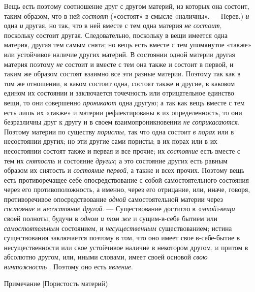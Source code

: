Вещь есть поэтому соотношение друг с другом материй, из которых она состоит,
таким образом, что в ней {\em состоят} («состоят» в
смысле «наличны». — Перев.) {\em и} одна
{\em и} другая, но так, что в ней вместе с тем одна
материя {\em не состоит}, поскольку состоит другая.
Следовательно, поскольку в вещи имеется одна материя, другая тем самым
снята; но вещь есть вместе с тем упомянутое «также» или устойчивое наличие
других материй. В состоянии одной материи другая материя поэтому
{\em не} состоит и вместе с тем она также и состоит в
первой, и таким же образом состоят взаимно все эти разные материи. Поэтому
так как в том же отношении, в каком состоит одна, состоят также и другие, в
каковом едином их состоянии и заключается точечность или отрицательное
единство вещи, то они совершенно {\em проникают} одна
другую; а так как вещь вместе с тем есть лишь их «также» и материи
рефлектированы в их определенность, то они безразличны друг к другу и в
своем взаимопроникновении {\em не соприкасаются}.
Поэтому материи по существу {\em пористы}, так что одна
состоит {\em в порах} или в несостоянии других; но эти
другие сами пористы; в их порах или в их несостоянии состоят также и первая
и все прочие; их {\em состояние} есть вместе с тем их
{\em снятость} и состояние
{\em других}; а это состояние других есть равным
образом их снятость и {\em состояние первой}, а также и
всех прочих. Поэтому вещь есть противоречащее себе опосредствование с собой
самостоятельного состояния через его противоположность, а именно, через его
отрицание, или, иначе, говоря, противоречивое опосредствование
{\em одной} самостоятельной материи через
{\em состояние} и {\em несостояние
другой}. — Существование достигло в
«{\em этой}»{\em  вещи} своей
полноты, будучи в {\em одном и том же} и сущим-в-себе
бытием или {\em самостоятельным} состоянием, и
{\em несущественным} существованием; истина
существования заключается поэтому в том, что оно имеет свое в-себе-бытие в
несущественности или свое устойчивое наличие в некотором другом, и притом в
абсолютно другом, или, иными словами, имеет своей основой
{\em свою ничтожность\footnotemark{}}
. Поэтому оно есть {\em явление}.

{\centering
Примечание
[Пористость материй)
\par}

